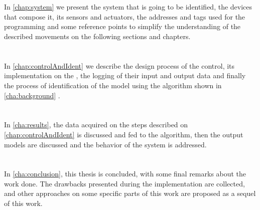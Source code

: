 \paragraph{} ~\\
In \autoref{chap:system} we present the system that is going to be identified,
the devices that compose it, its sensors and actuators, the addresses and tags
used for the programming and some reference points to simplify the understanding
of the described movements on the following sections and chapters.


\paragraph{} ~\\
In \autoref{chap:controlAndIdent} we describe the design process of the control,
its implementation on the \PLCs, the logging of their input and output data and
finally the process of identification of the model using the algorithm shown in
\autoref{cha:background} .

\paragraph{} ~\\
In \autoref{cha:results}, the data acquired on the steps described on
\autoref{chap:controlAndIdent} is discussed and fed to the algorithm, then the
output models are discussed and the behavior of the system is addressed.


\paragraph{} ~\\
In \autoref{cha:conclusion}, this thesis is concluded, with some final remarks
about the work done. The drawbacks presented during the implementation are
collected, and other approaches on some specific parts of this work are proposed
as a sequel of this work.


